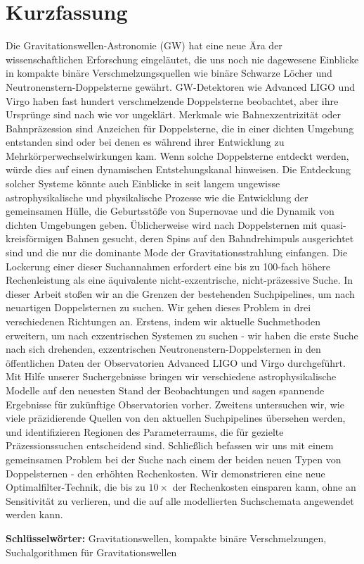 \chapter*{Kurzfassung}
\vspace*{-1.cm}
Die Gravitationswellen-Astronomie (GW) hat eine neue Ära der wissenschaftlichen Erforschung eingeläutet, die uns noch nie dagewesene Einblicke in kompakte binäre Verschmelzungsquellen wie binäre Schwarze Löcher und Neutronenstern-Doppelsterne gewährt. GW-Detektoren wie Advanced LIGO und Virgo haben fast hundert verschmelzende Doppelsterne beobachtet, aber ihre Ursprünge sind nach wie vor ungeklärt. Merkmale wie Bahnexzentrizität oder Bahnpräzession sind Anzeichen für Doppelsterne, die in einer dichten Umgebung entstanden sind oder bei denen es während ihrer Entwicklung zu \\ Mehrkörperwechselwirkungen kam. Wenn solche Doppelsterne entdeckt werden, würde dies auf einen dynamischen Entstehungskanal hinweisen. Die Entdeckung solcher Systeme könnte auch Einblicke in seit langem ungewisse astrophysikalische und physikalische Prozesse wie die Entwicklung der gemeinsamen Hülle, die Geburtsstöße von Supernovae und die Dynamik von dichten Umgebungen geben. Üblicherweise wird nach Doppelsternen mit quasi-kreisförmigen Bahnen gesucht, deren Spins auf den Bahndrehimpuls ausgerichtet sind und die nur die dominante Mode der Gravitationsstrahlung einfangen. Die Lockerung einer dieser Suchannahmen erfordert eine bis zu 100-fach höhere Rechenleistung als eine äquivalente nicht-exzentrische, nicht-präzessive Suche. In dieser Arbeit stoßen wir an die Grenzen der bestehenden Suchpipelines, um nach neuartigen Doppelsternen zu suchen. Wir gehen dieses Problem in drei verschiedenen Richtungen an. Erstens, indem wir aktuelle Suchmethoden erweitern, um nach exzentrischen Systemen zu suchen - wir haben die erste Suche nach sich drehenden, exzentrischen Neutronenstern-Doppelsternen in den öffentlichen Daten der Observatorien Advanced LIGO und Virgo durchgeführt. Mit Hilfe unserer Suchergebnisse bringen wir verschiedene astrophysikalische Modelle auf den neuesten Stand der Beobachtungen und sagen spannende Ergebnisse für zukünftige Observatorien vorher. Zweitens untersuchen wir, wie viele präzidierende Quellen von den aktuellen Suchpipelines übersehen werden, und identifizieren Regionen des Parameterraums, die für gezielte Präzessionssuchen entscheidend sind. Schließlich befassen wir uns mit einem gemeinsamen Problem bei der Suche nach einem der beiden neuen Typen von Doppelsternen - den erhöhten Rechenkosten. Wir demonstrieren eine neue Optimalfilter-Technik, die bis zu $10\times$ der Rechenkosten einsparen kann, ohne an Sensitivität zu verlieren, und die auf alle modellierten Suchschemata angewendet werden kann.

\clearpage
\thispagestyle{plain}
\textbf{Schlüsselwörter:} Gravitationswellen, kompakte binäre Verschmelzungen, Suchalgorithmen für Gravitationswellen